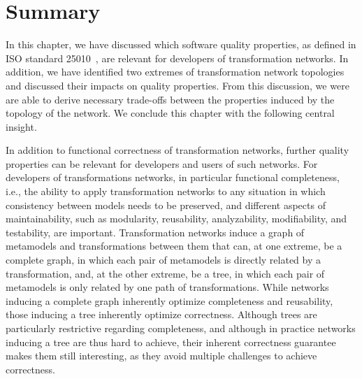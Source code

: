 \section{Summary}

In this chapter, we have discussed which software quality properties, as defined in ISO standard 25010~\cite{iso25010}, are relevant for developers of transformation networks.
In addition, we have identified two extremes of transformation network topologies and discussed their impacts on quality properties.
From this discussion, we were are able to derive necessary trade-offs between the properties induced by the topology of the network.
We conclude this chapter with the following central insight.

\begin{insight}
    In addition to functional correctness of transformation networks, further quality properties can be relevant for developers and users of such networks.
    For developers of transformations networks, in particular functional completeness, i.e., the ability to apply transformation networks to any situation in which consistency between models needs to be preserved, and different aspects of maintainability, such as modularity, reusability, analyzability, modifiability, and testability, are important.
    Transformation networks induce a graph of metamodels and transformations between them that can, at one extreme, be a complete graph, in which each pair of metamodels is directly related by a transformation, and, at the other extreme, be a tree, in which each pair of metamodels is only related by one path of transformations.
    While networks inducing a complete graph inherently optimize completeness and reusability, those inducing a tree inherently optimize correctness.
    Although trees are particularly restrictive regarding completeness, and although in practice networks inducing a tree are thus hard to achieve, their inherent correctness guarantee makes them still interesting, as they avoid multiple challenges to achieve correctness.
\end{insight}